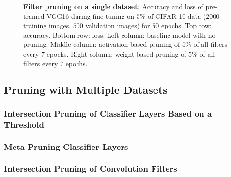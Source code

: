 \documentclass{article}
\begin{document}
\begin{figure}[!t]
{	}
	\caption{\textbf{Filter pruning on a single dataset:} Accuracy and loss of pre-trained VGG16 during fine-tuning on $5$\% of CIFAR-10 data ($2000$ training images, $500$ validation images) for $50$ epochs. Top row: accuracy. Bottom row: loss. Left column: baseline model with no pruning. Middle column: activation-based pruning of $5$\% of all filters every $7$ epochs. Right column: weight-based pruning of $5$\% of all filters every $7$ epochs.}
	\label{pruneFiltersSingle}
\end{figure}


\subsection{Pruning with Multiple Datasets}

\subsubsection{Intersection Pruning of Classifier Layers Based on a Threshold}


\subsubsection{Meta-Pruning Classifier Layers}


\subsubsection{Intersection Pruning of Convolution Filters}
\end{document}
